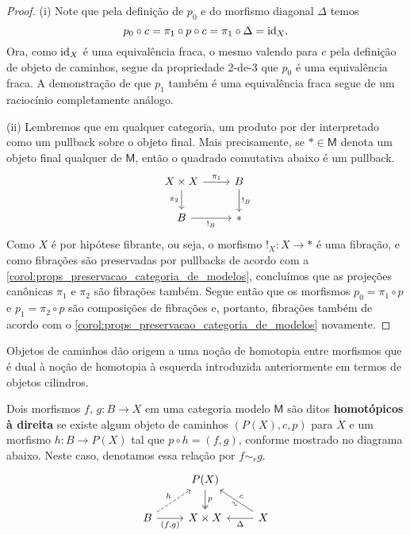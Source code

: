 \begin{proof}
  (i) Note que pela definição de $p_{0}$ e do morfismo diagonal $\Delta$ temos
  \begin{displaymath}
    p_{0} \circ c = \pi_{1} \circ p \circ c = \pi_{1} \circ \Delta = \mathrm{id}_{X}.
  \end{displaymath}
  Ora, como $\mathrm{id}_{X}$ é uma equivalência fraca, o mesmo valendo para $c$ pela definição de objeto de caminhos, segue da propriedade 2-de-3 que $p_{0}$ é uma equivalência fraca.
  A demonstração de que $p_{1}$ também é uma equivalência fraca segue de um raciocínio completamente análogo.

  \smallskip
  (ii) Lembremos que em qualquer categoria, um produto por der interpretado como um pullback sobre o objeto final.
  Mais precisamente, se $* \in \mathsf{M}$ denota um objeto final qualquer de $\mathsf{M}$, então o quadrado comutativa abaixo é um pullback.
  \begin{displaymath}
    \begin{tikzcd}
      X \times X
      \arrow[r, "\pi_{1}"]
      \arrow[d, "\pi_{2}" swap]
      & B
      \arrow[d, "!_{B}"]
      \\ B
      \arrow[r, "!_{B}" swap]
      & *
    \end{tikzcd}
  \end{displaymath}
  Como $X$ é por hipótese fibrante, ou seja, o morfismo $!_{X}: X \to *$ é uma fibração, e como fibrações são preservadas por pullbacks de acordo com a \cref{corol:props_preservacao_categoria_de_modelos}, concluímos que as projeções canônicas $\pi_{1}$ e $\pi_{2}$ são fibrações também.
  Segue então que os morfismos $p_{0} = \pi_{1} \circ p$ e $p_{1} = \pi_{2} \circ p$ são composições de fibrações e, portanto, fibrações também de acordo com o \cref{corol:props_preservacao_categoria_de_modelos} novamente.
\end{proof}

Objetos de caminhos dão origem a uma noção de homotopia entre morfismos que é dual à noção de homotopia à esquerda introduzida anteriormente em termos de objetos cilindros.

\begin{defin}\label{defin:homotopia_direita}
  Dois morfismos $f,\, g: B \to X$ em uma categoria modelo $\mathsf{M}$ são ditos \textbf{homotópicos à direita} se existe algum objeto de caminhos $(P(X),c,p)$ para $X$ e um morfismo $h: B \to P(X)$ tal que $p \circ h = (f,g)$, conforme mostrado no diagrama abaixo.
  Neste caso, denotamos essa relação por $f \sim_{r} g$.
  \begin{displaymath}
    \begin{tikzcd}
      & P(X)
      \arrow[d, two heads, "p"]
      \\ B
      \arrow[ru, dashed, "h"]
      \arrow[r, "{(f,g)}" swap]
      & X \times X
      & X
      \arrow[lu, "\sim" {sloped, swap}, "c" swap]
      \arrow[l, "\Delta"]
    \end{tikzcd}
  \end{displaymath}
\end{defin}

